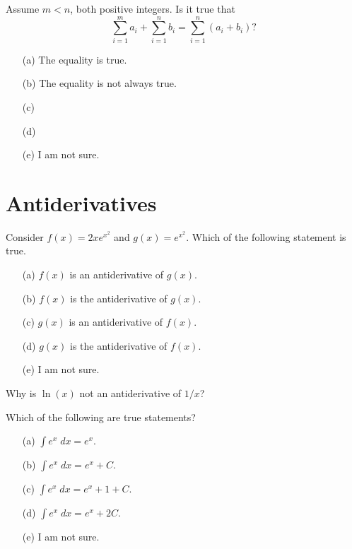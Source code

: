 \documentclass[14pt]{beamer}
\begin{document}
\begin{frame}[t]
  Assume \(m < n\), both positive integers. Is it true that 
  \[
    \sum_{i=1}^{m} a_{i} + \sum_{i=1}^{n} b_{i} = \sum_{i=1}^{n} (a_{i}+ b_{i})?
  \]

  \medskip
  \begin{itemize} \setlength\itemsep{1ex}
    \item[(a)] The equality is true.
    \item[(b)] The equality is not always true.
    \item[(c)] 
    \item[(d)] 
    \item[(e)] I am not sure.
  \end{itemize} 
\end{frame}

\section{Antiderivatives}

\begin{frame}[t]
  Consider \(f(x) = 2x e^{x^{2}}\) and \(g(x) = e^{x^{2}}\). Which of the following statement is true.

  \medskip
  \begin{itemize} \setlength\itemsep{1ex}
    \item[(a)] \(f(x)\) is an antiderivative of \(g(x)\).
    \item[(b)] \(f(x)\) is the antiderivative of \(g(x)\).
    \item[(c)] \(g(x)\) is an antiderivative of \(f(x)\).
    \item[(d)] \(g(x)\) is the antiderivative of \(f(x)\).
    \item[(e)] I am not sure.
  \end{itemize} 
\end{frame}

\begin{frame}
  Why is \(\ln(x)\) not an antiderivative of \(1/x\)?
\end{frame}

\begin{frame}[t]
  Which of the following are true statements?

  \medskip
  \begin{itemize} \setlength\itemsep{1ex}
    \item[(a)] \(\int e^{x} \;dx = e^{x}\).
    \item[(b)] \(\int e^{x} \;dx = e^{x} + C\).
    \item[(c)] \(\int e^{x} \;dx = e^{x} + 1 + C\).
    \item[(d)] \(\int e^{x} \;dx = e^{x} + 2C\).
    \item[(e)] I am not sure.
  \end{itemize} 
\end{frame}
\end{document}
